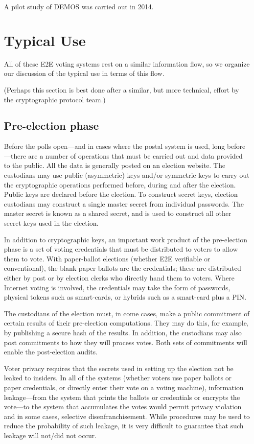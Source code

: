 A pilot study of DEMOS was carried out in 2014.


\section{Typical Use}

All of these E2E voting systems rest on a similar information flow, so we
organize our discussion of the typical use in terms of this flow.

(Perhaps this section is best done after a similar, but more technical,
effort by the cryptographic protocol team.)

\subsection{Pre-election phase}

Before the polls open---and in cases where the postal system is used, long
before---there are a number of operations that must be carried out and data
provided to the public. All the data is generally posted on an election
website. The custodians may use public (asymmetric) keys and/or symmetric
keys to carry out the cryptographic operations performed before, during and
after the election. Public keys are declared before the election. To
construct secret keys, election custodians may construct a single master
secret from individual passwords. The master secret is known as a shared
secret, and is used to construct all other secret keys used in the election.

In addition to cryptographic keys, an important work product of the
pre-election phase is a set of voting credentials that must be distributed
to voters to allow them to vote.  With paper-ballot elections (whether E2E
verifiable or conventional), the blank paper ballots are the credentials;
these are distributed either by post or by election clerks who directly hand
them to voters.  Where Internet voting is involved, the credentials may take
the form of passwords, physical tokens such as smart-cards, or hybrids such
as a smart-card plus a PIN.

The custodians of the election must, in come cases, make a public commitment
of certain results of their pre-election computations.  They may do this,
for example, by publishing a secure hash of the results. In addition, the
custodians may also post commitments to how they will process votes. Both
sets of commitments will enable the post-election audits.

Voter privacy requires that the secrets used in setting up the election not
be leaked to insiders.  In all of the systems (whether voters use paper
ballots or paper credentials, or directly enter their vote on a voting
machine), information leakage---from the system that prints the ballots or
credentials or encrypts the vote---to the system that accumulates the votes
would permit privacy violation and in some cases, selective
disenfranchisement. While procedures may be used to reduce the probability
of such leakage, it is very difficult to guarantee that such leakage will
not/did not occur.

